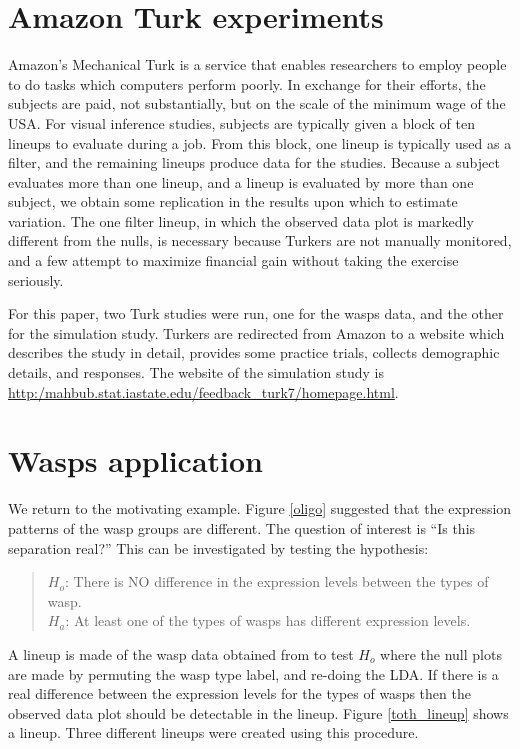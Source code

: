 \section{Amazon Turk experiments} \label{sec:turk}

Amazon's Mechanical Turk \citep{turk} is a service that enables researchers to employ people to do tasks which computers perform poorly. In exchange for their efforts, the subjects are paid, not substantially, but on the scale of the minimum wage of the USA. For visual inference studies, subjects are typically given a block of ten lineups to evaluate during a job. From this block, one lineup is typically used as a filter, and the remaining lineups produce data for the studies. Because a subject evaluates more than one lineup, and a lineup is evaluated by more than one subject, we obtain some replication in the results upon which to estimate variation. The one filter lineup, in which the observed data plot is markedly different from the nulls, is necessary because Turkers are not manually monitored, and a few attempt to maximize financial gain without taking the exercise seriously. 

For this paper, two Turk studies were run, one for the wasps data, and the other for the simulation study. Turkers are redirected from Amazon to a website which describes the study in detail, provides some practice trials, collects demographic details, and responses. The website of the simulation study is \url{http:/mahbub.stat.iastate.edu/feedback_turk7/homepage.html}.

\section{Wasps application} \label{sec:wasp}

We return to the motivating example. Figure \ref{oligo} suggested that the expression patterns of the wasp groups are different.  The question of interest is ``Is this separation real?'' This can be investigated by testing the hypothesis: 

\begin{quote}
$H_o$: There is NO difference in the expression levels between the types of wasp.\\
$H_a$: At least one of the types of wasps has different expression levels.
\end{quote}
A lineup is made of the wasp data obtained from \cite{toth:2010} to test $H_o$ where the null plots are made by permuting the wasp type label, and re-doing the LDA. If there is a real difference between the expression levels for the types of wasps then the observed data plot should be detectable in the lineup. Figure \ref{toth_lineup} shows a lineup.  Three different lineups were created using this procedure. 

